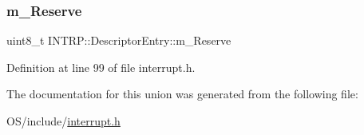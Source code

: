 \subsubsection{\texorpdfstring{m\+\_\+\+Reserve}{m\_Reserve}}
{\footnotesize\ttfamily uint8\+\_\+t I\+N\+T\+R\+P\+::\+Descriptor\+Entry\+::m\+\_\+\+Reserve}



Definition at line 99 of file interrupt.\+h.



The documentation for this union was generated from the following file\+:\begin{DoxyCompactItemize}
\item 
O\+S/include/\hyperlink{interrupt_8h}{interrupt.\+h}\end{DoxyCompactItemize}
